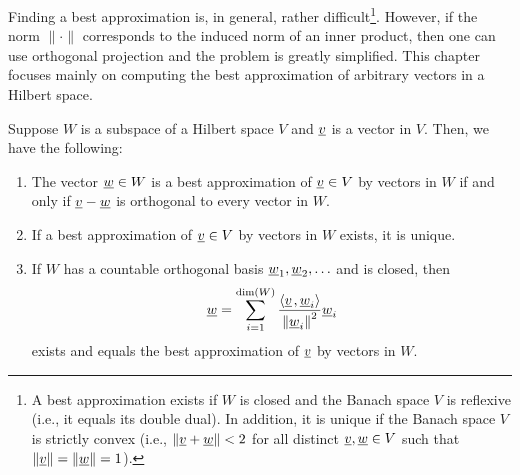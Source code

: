 Finding a best approximation is, in general, rather difficult\footnote{A best approximation exists if $W$ is closed and the Banach space $V$ is reflexive (i.e., it equals its double dual).  In addition, it is unique if the Banach space $V$ is strictly convex (i.e., $\|\underline{v} + \underline{w} \|<2$ for all distinct $\underline{v},\underline{w}\in V$ such that $\|\underline{v}\|=\|\underline{w}\| = 1$).}.
However, if the norm $\| \cdot \|$ corresponds to the induced norm of an inner product, then one can use orthogonal projection and the problem is greatly simplified.
This chapter focuses mainly on computing the best approximation of arbitrary vectors in a Hilbert space.
\begin{theorem} \label{theorem:OrthogonalProjection}
Suppose $W$ is a subspace of a Hilbert space $V$ and $\underline{v}$ is a vector in $V$.
Then, we have the following:
\begin{enumerate}
\item The vector $\underline{w} \in W$ is a best approximation of $\underline{v} \in V$ by vectors in $W$ if and only if $\underline{v} - \underline{w}$ is orthogonal to every vector in $W$.
\item If a best approximation of $\underline{v} \in V$ by vectors in $W$ exists, it is unique.
\item If $W$ has a countable orthogonal basis $\underline{w}_1, \underline{w}_2, \ldots$ and is closed, then
\begin{equation}
\label{equation:OrthogonalProjectionOrthogonalVectors}
\underline{w} = \sum_{i=1}^{\dim (W)} \frac{ {\left\langle  \underline{v}  \mskip2mu ,  \underline{w}_i  \right\rangle} }{ \left\| \underline{w}_i \right\|^2 } \underline{w}_i
\end{equation}
exists and equals the best approximation of $\underline{v}$ by vectors in $W$.
\end{enumerate}
\end{theorem}
